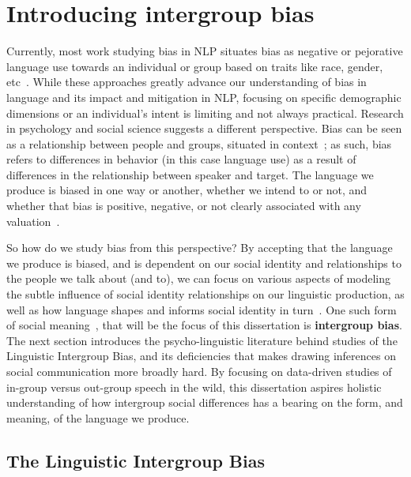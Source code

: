\chapter{Introducing intergroup bias}
\label{chapter:intro}

Currently, most work studying bias in NLP situates bias as negative or pejorative language use towards an individual or group based on traits like race, gender, etc~\citep{kaneko-bollegala-2019-gender, sheng-etal-2019-woman, sap-etal-2020-social, webson-etal-2020-undocumented, Pryzant_DiehlMartinez_Dass_Kurohashi_Jurafsky_Yang_2020, sheng-etal-2020-towards}.  While these approaches greatly advance our understanding of bias in language and its impact and mitigation in NLP, focusing on specific demographic dimensions or an individual's intent is limiting and not always practical. Research in psychology and social science suggests a different perspective. Bias can be seen as a relationship between people and groups, situated in context~\citep{van2009society}; as such, bias refers to differences in behavior (in this case language use) as a result of differences in the relationship between speaker and target. The language we produce is biased in one way or another, whether we intend to or not, and whether that bias is positive, negative, or not clearly associated with any valuation~\citep{beaver2018toward}.

So how do we study bias from this perspective? By accepting that the language we produce is biased, and is dependent on our social identity and relationships to the people we talk about (and to), we can focus on various aspects of modeling the subtle influence of social identity relationships on our linguistic production, as well as how language shapes and informs social identity in turn~\citep{eckert2012three}. One such form of social meaning~\citep{Hall-Lew_Moore_Podesva_2021,beltrama2020social}, that will be the focus of this dissertation is \textbf{intergroup bias}. The next section introduces the psycho-linguistic literature behind studies of the Linguistic Intergroup Bias, and its deficiencies that makes drawing inferences on social communication more broadly hard. By focusing on data-driven studies of in-group versus out-group speech in the wild, this dissertation aspires holistic understanding of how intergroup social differences has a bearing on the form, and meaning, of the language we produce.

\section{The Linguistic Intergroup Bias}
\label{sec:intro-lib}

